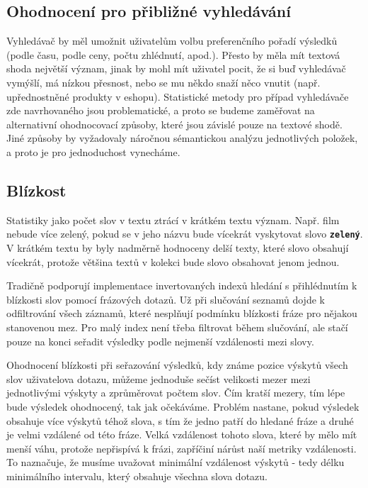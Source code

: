 \documentclass[11pt,letterpaper,oneside,openright]{book}
\newcommand{\bftt}[1]{\texttt{\textbf{#1}}}
\begin{document}
\subsection{Ohodnocení pro přibližné vyhledávání}
Vyhledávač by měl umožnit uživatelům volbu preferenčního pořadí výsledků (podle
času, podle ceny, počtu zhlédnutí, apod.). Přesto by měla mít textová shoda
největší význam, jinak by mohl mít uživatel pocit, že si buď vyhledávač
vymýšlí, má nízkou přesnost, nebo se mu někdo snaží něco vnutit (např.
upřednostněné produkty v eshopu). Statistické metody pro případ vyhledávače zde
navrhovaného jsou problematické, a proto se budeme zaměřovat na alternativní
ohodnocovací způsoby, které jsou závislé pouze na textové shodě. Jiné způsoby
by vyžadovaly náročnou sémantickou analýzu jednotlivých položek, a proto je pro
jednoduchost vynecháme.


\subsection{Blízkost}
Statistiky jako počet slov v textu ztrácí v krátkém textu význam. Např. film
nebude více zelený, pokud se v jeho názvu bude vícekrát vyskytovat slovo
\bftt{zelený}. V krátkém textu by byly nadměrně hodnoceny delší texty, které
slovo obsahují vícekrát, protože většina textů v kolekci bude slovo obsahovat
jenom jednou.

Tradičně podporují implementace invertovaných indexů hledání s přihlédnutím k
blízkosti slov pomocí frázových dotazů. Už při slučování seznamů dojde k
odfiltrování všech záznamů, které nesplňují podmínku blízkosti fráze pro
nějakou stanovenou mez. Pro malý index není třeba filtrovat během slučování,
ale stačí pouze na konci seřadit výsledky podle nejmenší vzdálenosti mezi
slovy.

Ohodnocení blízkosti při seřazování výsledků, kdy známe pozice výskytů všech
slov uživatelova dotazu, můžeme jednoduše sečíst velikosti mezer mezi
jednotlivými výskyty a zprůměrovat počtem slov. Čím kratší mezery, tím lépe
bude výsledek ohodnocený, tak jak očekáváme. Problém nastane, pokud výsledek
obsahuje více výskytů téhož slova, s tím že jedno patří do hledané fráze a
druhé je velmi vzdálené od této fráze. Velká vzdálenost tohoto slova, které by
mělo mít menší váhu, protože nepřispívá k frázi, zapříčiní nárůst naší metriky
vzdálenosti. To naznačuje, že musíme uvažovat minimální vzdálenost výskytů -
tedy délku minimálního intervalu, který obsahuje všechna slova dotazu.
\end{document}

